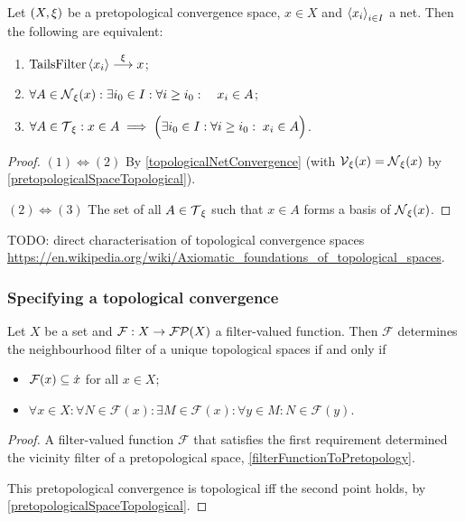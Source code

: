 \begin{lemma} \label{topologicalNetConvergence}
Let $\sSet{X,\xi}$ be a pretopological convergence space, $x\in X$ and $\left\langle x_i \right\rangle_{i\in I}$ a net. Then the following are equivalent:
\begin{enumerate}
\item $\operatorname{TailsFilter}\left\langle x_i \right\rangle \overset{\xi}{\longrightarrow} x$;
\item $\forall A\in \operatorname{\mathcal{N}}_\xi(x): \exists i_0\in I: \forall i \geq i_0: \quad x_i\in A$;
\item $\forall A\in \operatorname{\mathcal{T}}_\xi: x\in A \implies \Big(\exists i_0\in I: \forall i \geq i_0: \; x_i\in A\Big)$.
\end{enumerate}
\end{lemma}
\begin{proof}
$(1) \Leftrightarrow (2)$ By \ref{topologicalNetConvergence} (with $\operatorname{\mathcal{V}}_\xi(x) = \operatorname{\mathcal{N}}_\xi(x)$ by \ref{pretopologicalSpaceTopological}).


$(2) \Leftrightarrow (3)$ The set of all $A\in \operatorname{\mathcal{T}}_\xi$ such that $x\in A$ forms a basis of $\operatorname{\mathcal{N}}_\xi(x)$.
\end{proof}

TODO: direct characterisation of topological convergence spaces \url{https://en.wikipedia.org/wiki/Axiomatic_foundations_of_topological_spaces}.

\subsubsection{Specifying a topological convergence}

\begin{proposition}
Let $X$ be a set and $\mathcal{F}: X\to \operatorname{\mathcal{FP}}(X)$ a filter-valued function. Then $\mathcal{F}$ determines the neighbourhood filter of a unique topological spaces \textup{if and only if}
\begin{itemize}
\item $\mathcal{F}(x)\subseteq \dot{x}$ for all $x\in X$;
\item $\forall x\in X: \forall N\in \mathcal{F}(x): \exists M\in \mathcal{F}(x): \forall y\in M: N\in \mathcal{F}(y)$.
\end{itemize}
\end{proposition}
\begin{proof}
A filter-valued function $\mathcal{F}$ that satisfies the first requirement determined the vicinity filter of a pretopological space, \ref{filterFunctionToPretopology}.

This pretopological convergence is topological iff the second point holds, by \ref{pretopologicalSpaceTopological}.
\end{proof}

